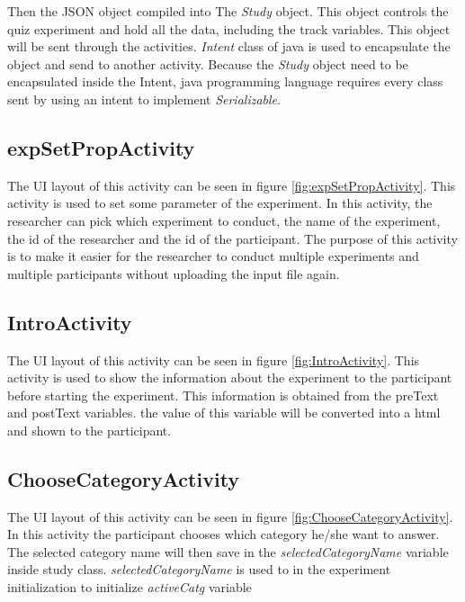 Then the JSON object compiled into The \textit{Study} object. This object controls the quiz experiment and hold all the data, including the track variables.
This object will be sent through the activities.
\textit{Intent} class of java is used to encapsulate the object and send to another activity.
Because the \textit{Study} object need to be encapsulated inside the Intent,
 java programming language requires every class sent by using an intent to implement \textit{Serializable}.

%

\subsection{expSetPropActivity}
The UI layout of this activity can be seen in figure \ref{fig:expSetPropActivity}.
This activity is used to set some parameter of the experiment. In this activity, the researcher can pick which experiment to conduct, the name of the experiment,
the id of the researcher and the id of the participant.
The purpose of this activity is to make it easier for the researcher to conduct multiple experiments and multiple participants without uploading the input file again.

\subsection{IntroActivity}
The UI layout of this activity can be seen in figure \ref{fig:IntroActivity}.
This activity is used to show the information about the experiment to the participant before starting the experiment.
This information is obtained from the preText and postText variables. the value of this variable will be converted into a html and shown to the participant.

\subsection{ChooseCategoryActivity}
The UI layout of this activity can be seen in figure \ref{fig:ChooseCategoryActivity}.
In this activity the participant chooses which category he/she want to answer.
The selected category name will then save in the \textit{selectedCategoryName} variable inside study class.
\textit{selectedCategoryName} is used to in the experiment initialization to initialize \textit{activeCatg} variable


